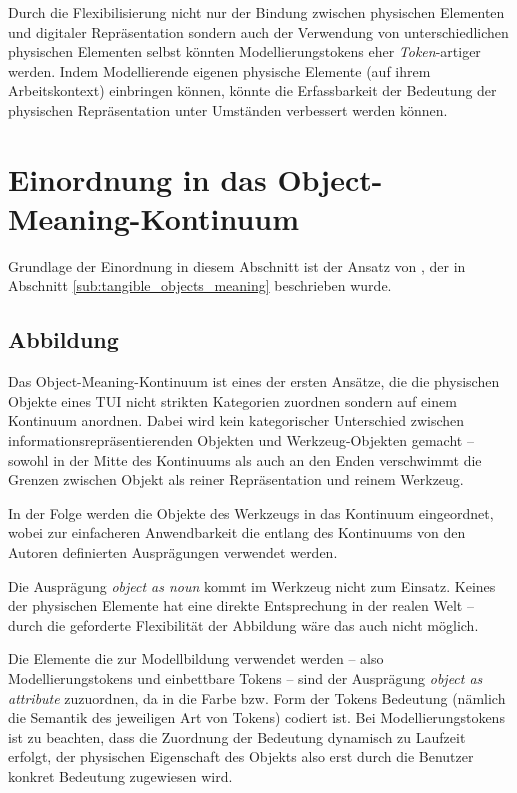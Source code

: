 Durch die Flexibilisierung nicht nur der Bindung zwischen physischen Elementen und digitaler Repräsentation sondern auch der Verwendung von unterschiedlichen physischen Elementen selbst könnten Modellierungstokens eher \emph{Token}-artiger werden. Indem Modellierende eigenen physische Elemente (auf ihrem Arbeitskontext) einbringen können, könnte die Erfassbarkeit der Bedeutung der physischen Repräsentation unter Umständen verbessert werden können.

\section{Einordnung in das Object-Meaning-Kontinuum} %
\label{sec:einordnung_in_das_object_meaning_kontinuum}

Grundlage der Einordnung in diesem Abschnitt ist der Ansatz von \citet{Underkoffler99}, der in Abschnitt \ref{sub:tangible_objects_meaning} beschrieben wurde.

\subsection{Abbildung} 

Das Object-Meaning-Kontinuum ist eines der ersten Ansätze, die die physischen Objekte eines \gls{TUI} nicht strikten Kategorien zuordnen sondern auf einem Kontinuum anordnen. Dabei wird kein kategorischer Unterschied zwischen informationsrepräsentierenden Objekten und Werkzeug-Objekten gemacht -- sowohl in der Mitte des Kontinuums als auch an den Enden verschwimmt die Grenzen zwischen Objekt als reiner Repräsentation und reinem Werkzeug. 

In der Folge werden die Objekte des Werkzeugs in das Kontinuum eingeordnet, wobei zur einfacheren Anwendbarkeit die entlang des Kontinuums von den Autoren definierten Ausprägungen verwendet werden.

Die Ausprägung \emph{object as noun} kommt im Werkzeug nicht zum Einsatz. Keines der physischen Elemente hat eine direkte Entsprechung in der realen Welt -- durch die geforderte Flexibilität der Abbildung wäre das auch nicht möglich. 

Die Elemente die zur Modellbildung verwendet werden -- also Modellierungstokens und einbettbare Tokens -- sind der Ausprägung \emph{object as attribute} zuzuordnen, da in die Farbe bzw. Form der Tokens Bedeutung (nämlich die Semantik des jeweiligen Art von Tokens) codiert ist. Bei Modellierungstokens ist zu beachten, dass die Zuordnung der Bedeutung dynamisch zu Laufzeit erfolgt, der physischen Eigenschaft des Objekts also erst durch die Benutzer konkret Bedeutung zugewiesen wird.

